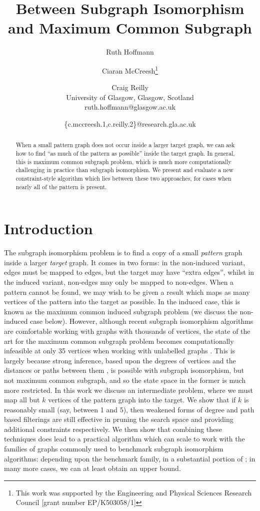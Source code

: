 \documentclass[letterpaper]{article}
\title{Between Subgraph Isomorphism and Maximum Common Subgraph}
\author{Ruth Hoffmann \and Ciaran McCreesh\thanks{This work was supported by the Engineering and Physical Sciences
Research Council [grant number EP/K503058/1]} \and Craig Reilly \\
University of Glasgow, Glasgow, Scotland \\
ruth.hoffmann@glasgow.ac.uk \and \{c.mccreesh.1,c.reilly.2\}@research.gla.ac.uk}
\newcommand{\citep}[1]{\cite{#1}}
\theoremstyle{definition}
\begin{document}
\maketitle

\begin{abstract}
    When a small pattern graph does not occur inside a larger target graph, we can ask how to find
    ``as much of the pattern as possible'' inside the target graph. In general, this is maximum
    common subgraph problem, which is much more computationally challenging in practice than
    subgraph isomorphism. We present and evaluate a new constraint-style algorithm which lies
    between these two approaches, for cases when nearly all of the pattern is present.
\end{abstract}

\section{Introduction}

The subgraph isomorphism problem is to find a copy of a small \emph{pattern} graph inside a larger
\emph{target} graph. It comes in two forms: in the non-induced variant, edges must be mapped to
edges, but the target may have ``extra edges'', whilst in the induced variant, non-edges may only be
mapped to non-edges. When a pattern cannot be found, we may wish to be given a result which maps as
many vertices of the pattern into the target as possible. In the induced case, this is known as the
maximum common induced subgraph problem (we discuss the non-induced case below). However, although
recent subgraph isomorphism algorithms are comfortable working with graphs with thousands of
vertices, the state of the art for the maximum common subgraph problem becomes computationally
infeasible at only 35 vertices when working with unlabelled graphs \citep{CP2016MCSPaper}. This is
largely because strong inference, based upon the degrees of vertices
\citep{DBLP:journals/ai/Solnon10} and the distances or paths between them
\citep{DBLP:conf/cp/AudemardLMGP14,DBLP:conf/cp/McCreeshP15}, is possible with subgraph isomorphism,
but not maximum common subgraph, and so the state space in the former is much more restricted. In
this work we discuss an intermediate problem, where we must map all but $k$ vertices of the pattern
graph into the target. We show that if $k$ is reasonably small (say, between 1 and 5), then weakened
forms of degree and path based filterings are still effective in pruning the search space and
providing additional constraints respectively. We then show that combining these techniques does
lead to a practical algorithm which can scale to work with the families of graphs commonly used to
benchmark subgraph isomorphism algorithms: depending upon the benchmark family, in a substantial
portion of ; in many more cases, we can at least obtain an upper bound.
\end{document}
